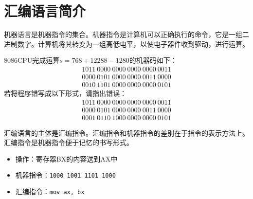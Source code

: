 \section{汇编语言简介}

\begin{frame}
  \begin{defn}{}
    机器语言是机器指令的集合。机器指令是计算机可以正确执行的命令，它是一组二进制数字。计算机将其转变为一组高低电平，以使电子器件收到驱动，进行运算。
  \end{defn}
  \pause
  
  \begin{exam}{}
    8086CPU完成运算$s=768+12288-1280$的机器码如下：
    $$
    \begin{array}{c}
      1011~0000~0000~0000~0000~0011\\
      0000~0101~0000~0000~0011~0000\\
      0010~1101~0000~0000~0000~0101
    \end{array}
    $$
    \pause
    若将程序错写成以下形式，请指出错误：
    $$
    \begin{array}{c}
      1011~0000~0000~0000~0000~0011\\
      0000~0101~0000~0000~0011~0000\\
      0001~0110~1000~0000~0000~0101
    \end{array}
    $$
  \end{exam}
\end{frame}




\begin{frame}\ft{\secname}
  \begin{defn}[汇编语言]{}
    汇编语言的主体是汇编指令。汇编指令和机器指令的差别在于指令的表示方法上。{汇编指令是机器指令便于记忆的书写形式。}
  \end{defn}
  \pause 

  \begin{exam}{}
    \begin{itemize}
    \item[]
      操作：寄存器BX的内容送到AX中\\
    \item[]
      机器指令：\lstinline|1000 1001 1101 1000|\\
    \item[]
      汇编指令：\lstinline|mov ax, bx|
    \end{itemize}
  \end{exam}
\end{frame}


